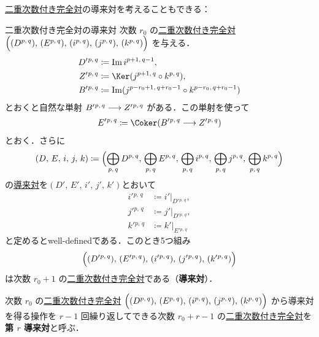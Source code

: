 \documentclass[algtopo_main]{subfiles}
\begin{document}
\hyperref[def:BEC]{二重次数付き完全対}の導来対を考えることもできる：

\begin{myprop}[label=def:DC-BEC, breakable]{二重次数付き完全対の導来対}
    次数 $r_0$ の\hyperref[def:BEC]{二重次数付き完全対} $\Bigl( (D^{p,\, q}),\, (E^{p,\, q}),\, (i^{p,\, q}),\, (j^{p,\, q}),\, (k^{p,\, q}) \Bigr)$ を与える．
    \begin{align}
        D'{}^{p,\, q} &\coloneqq \Im i^{p+1,\, q-1}, \\
        Z'{}^{p,\, q} &\coloneqq \Ker (j^{p+1,\, q} \circ k^{p,\, q}), \\
        B'{}^{p,\, q} &\coloneqq \Im (j^{p-r_0+1,\, q+r_0-1} \circ k^{p-r_0,\, q+r_0-1})
    \end{align}
    とおくと自然な単射 $B'{}^{p,\, q} \longrightarrow Z'{}^{p,\, q}$ がある．この単射を使って
    \begin{align}
        E'{}^{p,\, q} \coloneqq \Coker (B'{}^{p,\, q} \lto Z'{}^{p,\, q})
    \end{align}
    とおく．さらに
    \begin{align}
        (D,\, E,\, i,\, j,\, k) \coloneqq \Bigl( \bigoplus_{p,\, q} D^{p,\, q},\, \bigoplus_{p,\, q} E^{p,\, q},\, \bigoplus_{p,\, q} i^{p,\, q},\, \bigoplus_{p,\, q} j^{p,\, q},\, \bigoplus_{p,\, q} k^{p,\, q} \Bigr)
    \end{align}
    の\hyperref[def:DC]{導来対}を$(D',\, E',\, i',\, j',\, k')$とおいて
    \begin{align}
        i'{}^{p,\, q} &\coloneqq i'|_{D'{}^{p,\, q}}, \\
        j'{}^{p,\, q} &\coloneqq j'|_{D'{}^{p,\, q}}, \\
        k'{}^{p,\, q} &\coloneqq k'|_{E'{}^{p,\, q}}
    \end{align}
    と定めるとwell-definedである．このとき5つ組み
    \begin{align}
        \Bigl( (D'{}^{p,\, q}),\, (E'{}^{p,\, q}),\, (i'{}^{p,\, q}),\, (j'{}^{p,\, q}),\, (k'{}^{p,\, q}) \Bigr)
    \end{align}
    は次数 $r_0 + 1$ の\hyperref[def:BEC]{二重次数付き完全対}である（\textbf{導来対}）．

    \tcblower

    次数 $r_0$ の\hyperref[def:BEC]{二重次数付き完全対} $\Bigl( (D^{p,\, q}),\, (E^{p,\, q}),\, (i^{p,\, q}),\, (j^{p,\, q}),\, (k^{p,\, q}) \Bigr)$ から導来対を得る操作を $r-1$ 回繰り返してできる次数 $r_0 + r - 1$ の\hyperref[def:BEC]{二重次数付き完全対}を\textbf{第 $r$ 導来対}と呼ぶ．
\end{myprop}
\end{document}
